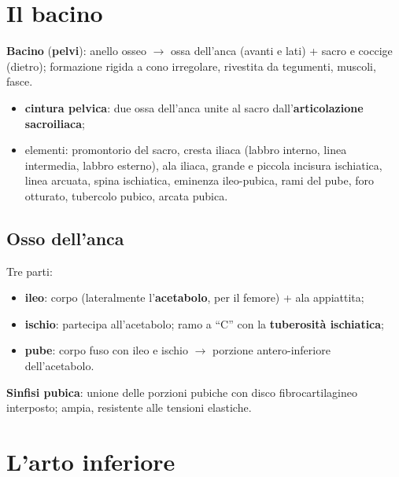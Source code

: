 \section{Il bacino}

\textbf{Bacino} (\textbf{pelvi}): anello osseo $\rightarrow$ ossa dell'anca (avanti e lati) + sacro
e coccige (dietro); formazione rigida a cono irregolare, rivestita da tegumenti, muscoli, fasce.
\begin{itemize}
  \item \textbf{cintura pelvica}: due ossa dell'anca unite al sacro dall'\textbf{articolazione
    sacroiliaca};
  \item elementi: promontorio del sacro, cresta iliaca (labbro interno, linea intermedia, labbro
    esterno), ala iliaca, grande e piccola incisura ischiatica, linea arcuata, spina ischiatica,
    eminenza ileo-pubica, rami del pube, foro otturato, tubercolo pubico, arcata pubica.
\end{itemize}

\subsection{Osso dell'anca}
Tre parti:
\begin{itemize}
  \item \textbf{ileo}: corpo (lateralmente l'\textbf{acetabolo}, per il femore) + ala appiattita;
  \item \textbf{ischio}: partecipa all'acetabolo; ramo a ``C'' con la \textbf{tuberosità
    ischiatica};
  \item \textbf{pube}: corpo fuso con ileo e ischio $\rightarrow$ porzione antero-inferiore
    dell'acetabolo.
\end{itemize}
\textbf{Sinfisi pubica}: unione delle porzioni pubiche con disco fibrocartilagineo interposto; ampia,
resistente alle tensioni elastiche.

\section{L'arto inferiore}

